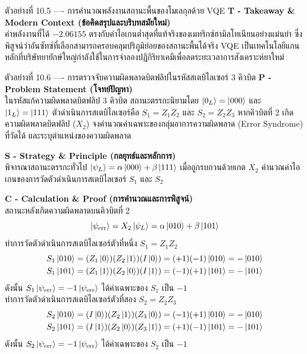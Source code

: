 \begin{psctbox}{ตัวอย่างที่ 10.5 ---- การคำนวณพลังงานสถานะพื้นของโมเลกุลด้วย VQE}
\vspace{4pt}
\noindent\textbf{T - Takeaway \& Modern Context (ข้อคิดสรุปและบริบทสมัยใหม่)} \\
ค่าพลังงานที่ได้ $-2.06155$ ตรงกับค่าไอเกนต่ำสุดที่แท้จริงของเมทริกซ์ฮามิลโทเนียนอย่างแม่นยำ ซึ่งพิสูจน์ว่าอันซัทซ์ที่เลือกสามารถครอบคลุมปริภูมิย่อยของสถานะพื้นได้จริง VQE เป็นเทคโนโลยีแกนหลักที่บริษัทยายักษ์ใหญ่กำลังใช้ในการจำลองปฏิกิริยาเคมีเพื่อลดระยะเวลาการสังเคราะห์ยาใหม่
\end{psctbox}

\begin{psctbox}{ตัวอย่างที่ 10.6 ---- การตรวจจับความผิดพลาดบิตฟลิปในรหัสสเตบิไลเซอร์ 3 คิวบิต}
\noindent\textbf{P - Problem Statement (โจทย์ปัญหา)} \\
ในรหัสแก้ความผิดพลาดบิตฟลิป 3 คิวบิต สถานะตรรกะนิยามโดย $\ket{0_L} = \ket{000}$ และ $\ket{1_L} = \ket{111}$ ตัวดำเนินการสเตบิไลเซอร์คือ $S_1 = Z_1 Z_2$ และ $S_2 = Z_2 Z_3$ หากคิวบิตที่ 2 เกิดความผิดพลาดบิตฟลิป ($X_2$) จงคำนวณค่าเฉพาะของกลุ่มอาการความผิดพลาด (Error Syndrome) ที่วัดได้ และระบุตำแหน่งของความผิดพลาด

\vspace{4pt}
\noindent\textbf{S - Strategy \& Principle (กลยุทธ์และหลักการ)} \\
พิจารณาสถานะตรรกะทั่วไป $\ket{\psi_L} = \alpha\ket{000} + \beta\ket{111}$ เมื่อถูกรบกวนด้วยเกต $X_2$ คำนวณค่าไอเกนของการวัดตัวดำเนินการสเตบิไลเซอร์ $S_1$ และ $S_2$

\vspace{4pt}
\noindent\textbf{C - Calculation \& Proof (การคำนวณและการพิสูจน์)} \\
สถานะหลังเกิดความผิดพลาดบนคิวบิตที่ 2
\begin{equation}
\ket{\psi_{\text{err}}} = X_2 \ket{\psi_L} = \alpha\ket{010} + \beta\ket{101}
\end{equation}
ทำการวัดตัวดำเนินการสเตบิไลเซอร์ตัวที่หนึ่ง $S_1 = Z_1 Z_2$
\begin{align}
S_1 \ket{010} &= (Z_1\ket{0})(Z_2\ket{1})(I\ket{0}) = (+1)(-1)\ket{010} = -\ket{010} \\
S_1 \ket{101} &= (Z_1\ket{1})(Z_2\ket{0})(I\ket{1}) = (-1)(+1)\ket{101} = -\ket{101}
\end{align}
ดังนั้น $S_1 \ket{\psi_{\text{err}}} = -1 \ket{\psi_{\text{err}}}$ ได้ค่าเฉพาะของ $S_1$ เป็น \textbf{$-1$} \\
ทำการวัดตัวดำเนินการสเตบิไลเซอร์ตัวที่สอง $S_2 = Z_2 Z_3$
\begin{align}
S_2 \ket{010} &= (I\ket{0})(Z_2\ket{1})(Z_3\ket{0}) = (-1)(+1)\ket{010} = -\ket{010} \\
S_2 \ket{101} &= (I\ket{1})(Z_2\ket{0})(Z_3\ket{1}) = (+1)(-1)\ket{101} = -\ket{101}
\end{align}
ดังนั้น $S_2 \ket{\psi_{\text{err}}} = -1 \ket{\psi_{\text{err}}}$ ได้ค่าเฉพาะของ $S_2$ เป็น \textbf{$-1$}


\end{psctbox}
